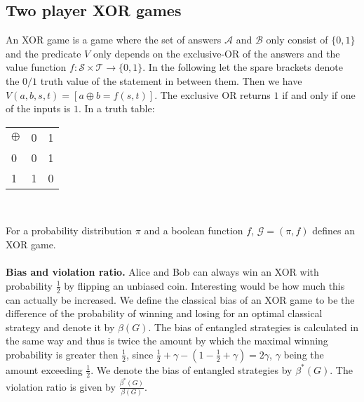 \subsection{Two player XOR games}
An XOR game is a game where the set of answers $\mathcal{A}$ and $\mathcal{B}$ only consist of $\{ 0,1 \}$ and the predicate $V$ only depends on the exclusive-OR of the answers and the value function $f : \mathcal{S} \times \mathcal{T} \rightarrow \{ 0,1 \}$. In the following let the spare brackets denote the $0/1$ truth value of the statement in between them. Then we have $V(a,b,s,t) = \left[ a \oplus b = f(s,t) \right]$. 
The exclusive OR returns $1$ if and only if one of the inputs is $1$. In a truth table: \\
\begin{center}
\begin{tabular}{l | c r }
$\oplus$ & 0 & 1 \\
\cline{1-3} 

0 & 0 & 1 \\
1 & 1 & 0 
\end{tabular}\\
\end{center}

For a probability distribution $\pi$ and a boolean function $f$, $\mathcal{G}= (\pi, f)$ defines an XOR game.\\ \\
\textbf{Bias and violation ratio.} Alice and Bob can always win an XOR with probability $\frac{1}{2}$ by flipping an unbiased coin. Interesting would be how much this can actually be increased. We define the classical bias of an XOR game to be the difference of the probability of winning and losing for an optimal classical strategy and denote it by $\beta(G)$. The bias of entangled strategies is calculated in the same way and thus is twice the amount by which the maximal winning probability is greater then $\frac{1}{2}$, since $\frac{1}{2}+\gamma - (1 - \frac{1}{2} + \gamma) = 2 \gamma$, $\gamma$ being the amount exceeding $\frac{1}{2}$. We denote the bias of entangled strategies by $\beta^*(G)$. The violation ratio is given by $\frac{\beta^*(G)}{\beta(G)}$.\\ \\

